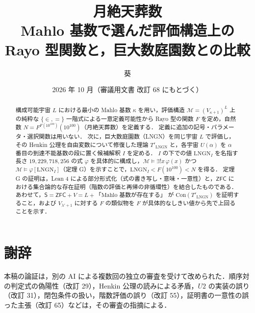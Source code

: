 \documentclass[a4paper,11pt]{ltjsarticle}
\title{月絶天葬数\\[0.5em]{\large Mahlo 基数で選んだ評価構造上の Rayo 型関数と，巨大数庭園数との比較}}
\author{葵}
\date{2026 年 10 月（審議用文書 改訂 68 にもとづく）}
\theoremstyle{plain}
\theoremstyle{definition}
\newcommand{\M}{\mathcal{M}}
\newcommand{\LNGN}{\mathrm{LNGN}}
\newcommand{\Con}{\mathrm{Con}}
\newcommand{\ZFC}{\mathsf{ZFC}}
\newcommand{\Sth}{\mathsf{S}}
\newcommand{\T}{T'_{\LNGN}}
\begin{document}
\maketitle

\begin{abstract}
構成可能宇宙 $L$ における最小の Mahlo 基数 $\kappa$ を用い，評価構造 $\M=(V_{\kappa+1})^L$ 上の純粋な $\{\in,=\}$ 一階式による一意定義可能性から Rayo 型の関数 $F$ を定め，自然数 $N=F^{F(10^{100})}(10^{100})$（月絶天葬数）を定義する．
定義に追加の記号・パラメータ・選択関数は用いない．
次に，巨大数庭園数（LNGN）を同じ宇宙 $L$ で評価し，その Henkin 公理を自由変数について修復した理論 $\T$ と，各宇宙 $U(\alpha)$ を $\alpha$ 番目の到達不能基数の段に置く候補解釈 $I$ を定める．
$I$ の下での値 $\LNGN_I$ を名指す長さ $19{,}229{,}718{,}256$ の式 $\varphi$ を具体的に構成し，$\M\models\exists!x\,\varphi(x)$ かつ $\M\models\varphi[\LNGN_I]$（定理 G）を示すことで，$\LNGN_I<F(10^{100})<N$ を得る．
定理 G の証明は，Lean 4 による部分形式化（式の書き写し・意味・一意性）と，$\ZFC$ における集合論的な存在証明（階数の評価と再帰の非循環性）を結合したものである．
あわせて，$\Sth=\ZFC+V{=}L+\text{「Mahlo 基数が存在する」}$ が $\Con(\T)$ を証明すること，および $V_{\lambda'+1}$ に対する $F$ の類似物を $F$ が具体的なしきい値から先で上回ることを示す．
\end{abstract}

\tableofcontents










\appendix


\section*{謝辞}
本稿の論証は，別の AI による複数回の独立の審査を受けて改められた．順序対の判定式の偽陽性（改訂 29），Henkin 公理の読みによる矛盾，$U2$ の実装の誤り（改訂 31），閉包条件の扱い，階数評価の誤り（改訂 55），証明書の一意性の誤った主張（改訂 65）などは，その審査の指摘による．
\end{document}
